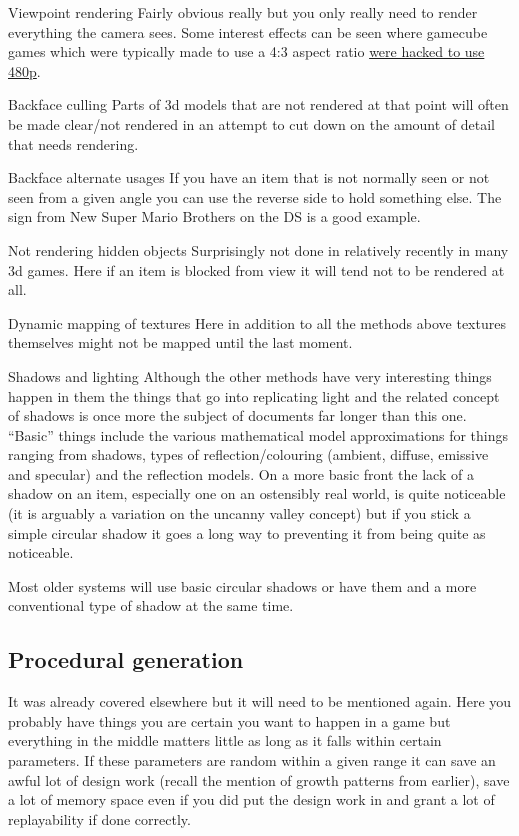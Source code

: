 \documentclass[
]{book}
\begin{document}
Viewpoint rendering Fairly obvious really but you only really need to render everything the camera sees. Some interest effects can be seen where gamecube games which were typically made to use a 4:3 aspect ratio \href{http://www.youtube.com/watch?\&v=qombIUAadOs}{were hacked to use 480p}.

Backface culling Parts of 3d models that are not rendered at that point will often be made clear/not rendered in an attempt to cut down on the amount of detail that needs rendering.

Backface alternate usages If you have an item that is not normally seen or not seen from a given angle you can use the reverse side to hold something else. The sign from New Super Mario Brothers on the DS is a good example.

Not rendering hidden objects Surprisingly not done in relatively recently in many 3d games. Here if an item is blocked from view it will tend not to be rendered at all.

Dynamic mapping of textures Here in addition to all the methods above textures themselves might not be mapped until the last moment.

Shadows and lighting Although the other methods have very interesting things happen in them the things that go into replicating light and the related concept of shadows is once more the subject of documents far longer than this one. ``Basic'' things include the various mathematical model approximations for things ranging from shadows, types of reflection/colouring (ambient, diffuse, emissive and specular) and the reflection models. On a more basic front the lack of a shadow on an item, especially one on an ostensibly real world, is quite noticeable (it is arguably a variation on the uncanny valley concept) but if you stick a simple circular shadow it goes a long way to preventing it from being quite as noticeable.

Most older systems will use basic circular shadows or have them and a more conventional type of shadow at the same time.

\hypertarget{procedural-generation}{%
\subsection{Procedural generation}\label{procedural-generation}}

It was already covered elsewhere but it will need to be mentioned again. Here you probably have things you are certain you want to happen in a game but everything in the middle matters little as long as it falls within certain parameters. If these parameters are random within a given range it can save an awful lot of design work (recall the mention of growth patterns from earlier), save a lot of memory space even if you did put the design work in and grant a lot of replayability if done correctly.
\end{document}

